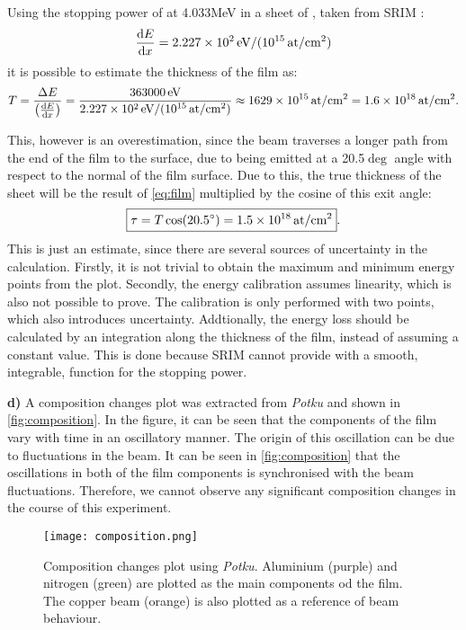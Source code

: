 Using the stopping power of  at 4.033\unit{MeV} in a sheet of , taken from SRIM \cite{srim}: $$\frac{\text{d} E}{\text{d} x} = 2.227\times 10^{2}\,\text{eV/(10$^{15}$\,at/cm$^2$)}$$ it is possible to estimate the thickness of the film as:
\begin{equation}
    \label{eq:film}
    T = \frac{\Delta E}{\left(\frac{\text{d} E}{\text{d} x}\right)} = \frac{363000\,\text{eV}}{2.227\times 10^{2}\,\text{eV/(10$^{15}$\,at/cm$^2$)}} \approx 1629\times 10^{15}\,\text{at/cm$^2$} = 1.6\times 10^{18}\,\text{at/cm$^2$}.
\end{equation}

This, however is an overestimation, since the beam traverses a longer path from the end of the film to the surface, due to being emitted at a 20.5$\deg$ angle with respect to the normal of the film surface. Due to this, the true thickness of the sheet will be the result of \autoref{eq:film} multiplied by the cosine of this exit angle:
\begin{equation}
    \label{eq:filmcos}
    \boxed{\tau = T\cos(20.5^{\circ}) = 1.5\times 10^{18}\,\text{at/cm$^2$}}.
\end{equation}
This is just an estimate, since there are several sources of uncertainty in the calculation. Firstly, it is not trivial to obtain the maximum and minimum energy points from the plot. Secondly, the energy calibration assumes linearity, which is also not possible to prove. The calibration is only performed with two points, which also introduces uncertainty. Addtionally, the energy loss should be calculated by an integration along the thickness of the film, instead of assuming a constant value. This is done because SRIM cannot provide with a smooth, integrable, function for the stopping power. 

\textbf{d)} A composition changes plot was extracted from \textit{Potku} and shown in \autoref{fig:composition}. In the figure, it can be seen that the components of the film vary with time in an oscillatory manner. The origin of this oscillation can be due to fluctuations in the beam. It can be seen in \autoref{fig:composition} that the oscillations in both of the film components is synchronised with the beam fluctuations. Therefore, we cannot observe any significant composition changes in the course of this experiment.

\begin{figure}[h!]
    \centering
    \texttt{[image: composition.png]}
    \caption{Composition changes plot using \textit{Potku}. Aluminium (purple) and nitrogen (green) are plotted as the main components od the film. The copper beam (orange) is also plotted as a reference of beam behaviour.}
    \label{fig:composition}
\end{figure}
\newpage



